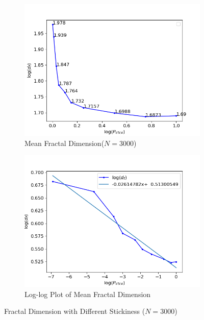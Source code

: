 \documentclass[aps,preprint,groupedaddress,letterpaper]{revtex4-1}
\begin{document}
\begin{figure}[h]
     \centering
     \begin{subfigure}[h]{0.45\textwidth}
         \centering
         \includegraphics[width=\textwidth]{img/stickiness/dfst.png}
         \caption{Mean Fractal Dimension($N = 3000$)}
         \label{dfst}
     \end{subfigure}
     \hfill
     \begin{subfigure}[h]{0.45\textwidth}
         \centering
         \includegraphics[width=\textwidth]{img/stickiness/logdfst.png}
         \caption{Log-log Plot of Mean Fractal Dimension}
         \label{logst}
     \end{subfigure}
        \caption{Fractal Dimension with Different Stickiness ($N = 3000$)}
        \label{sts}
\end{figure}
\end{document}
